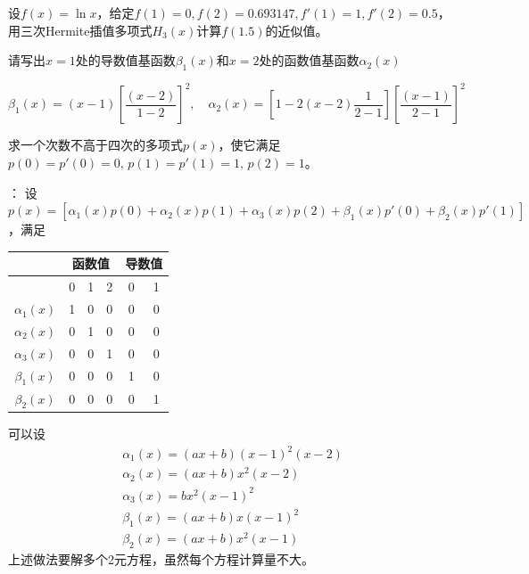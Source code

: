 \begin{example}
    设$f(x) = \ln x$，给定$f(1) = 0,f(2) = 0.693147,f'(1) = 1,f'(2) = 0.5$，用三次Hermite插值多项式$H_3(x)$计算$f(1.5)$的近似值。
    
    请写出$x = 1$处的导数值基函数$\beta_1(x)$和$x = 2$处的函数值基函数$\alpha_2(x)$
    \begin{solution}
        $\beta_{1}(x) = (x-1)\left[ \dfrac{(x-2)}{1-2} \right]^2,\quad \alpha_2(x) = \left[ 1-2(x-2)\dfrac{1}{2-1} \right]\left[ \dfrac{(x-1)}{2-1} \right]^2$
    \end{solution}
\end{example}
\begin{example}
    求一个次数不高于四次的多项式$p(x)$，使它满足$p(0) = p'(0) = 0,\,p(1) = p'(1) = 1,\,p(2) = 1$。
    \begin{solution}
        [解法一]：
        设$p(x) = \left[ \alpha_1(x)p(0)+\alpha_2(x)p(1)+\alpha_3(x)p(2) + \beta_1(x)p'(0)+\beta_2(x)p'(1) \right]$，满足
        \begin{table}[htbp]
            \centering
            \begin{tabular}{|c|c|c|c|c|c|}
            \hline
                & \multicolumn{3}{c|}{函数值} & \multicolumn{2}{c|}{导数值} \bigstrut\\
            \hline
                & 0   & 1   & 2   & 0   & 1 \bigstrut\\
            \hline
            $\alpha_1(x)$ & 1   & 0   & 0   & 0   & 0 \bigstrut\\
            \hline
            $\alpha_2(x)$ & 0   & 1   & 0   & 0   & 0 \bigstrut\\
            \hline
            $\alpha_3(x)$ & 0   & 0   & 1   & 0   & 0 \bigstrut\\
            \hline
            $\beta_1(x)$ & 0   & 0   & 0   & 1   & 0 \bigstrut\\
            \hline
            $\beta_2(x)$ & 0   & 0   & 0   & 0   & 1 \bigstrut\\
            \hline
            \end{tabular}%
        \end{table}%
        可以设
        \[
            \begin{array}{l}
                \alpha_{1}(x) = (ax+b)(x-1)^2(x-2) \\
                \alpha_{2}(x) = (ax+b)x^2(x-2) \\
                \alpha_{3}(x) = bx^2(x-1)^2 \\ 
                \beta_{1}(x) = (ax+b)x(x-1)^2 \\
                \beta_{2}(x) = (ax+b)x^2(x-1)
            \end{array}    
        \]
        上述做法要解多个2元方程，虽然每个方程计算量不大。


\end{solution}
\end{example}
